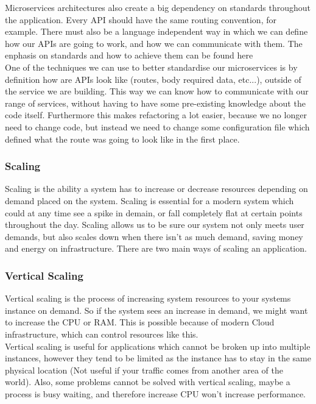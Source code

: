 \documentclass[titlepage]{article}
\begin{document}
Microservices architectures also create a big dependency on standards throughout the application. Every API should have the same routing convention, for example. There must also be a language independent way in which we can define how our APIs are going to work, and how we can communicate with them. The enphasis on standards and how to achieve them can be found here ~\cite{microservices_talk} \\

One of the techniques we can use to better standardise our microservices is by definition how are APIs look like (routes, body required data, etc...), outside of the service we are building. This way we can know how to communicate with our range of services, without having to have some pre-existing knowledge about the code itself. Furthermore this makes refactoring a lot easier, because we no longer need to change code, but instead we need to change some configuration file which defined what the route was going to look like in the first place.

\subsubsection{Scaling}
Scaling is the ability a system has to increase or decrease resources depending on demand placed on the system. Scaling is essential for a modern system which could at any time see a spike in demain, or fall completely flat at certain points throughout the day. Scaling allows us to be sure our system not only meets user demands, but also scales down when there isn't as much demand, saving money and energy on infrastructure. There are two main ways of scaling an application.

\subsubsection{Vertical Scaling}
Vertical scaling is the process of increasing system resources to your systems instance on demand. So if the system sees an increase in demand, we might want to increase the CPU or RAM. This is possible because of modern Cloud infrastructure, which can control resources like this. \\

Vertical scaling is useful for applications which cannot be broken up into multiple instances, however they tend to be limited as the instance has to stay in the same physical location (Not useful if your traffic comes from another area of the world). Also, some problems cannot be solved with vertical scaling, maybe a process is busy waiting, and therefore increase CPU won't increase performance.
\end{document}
